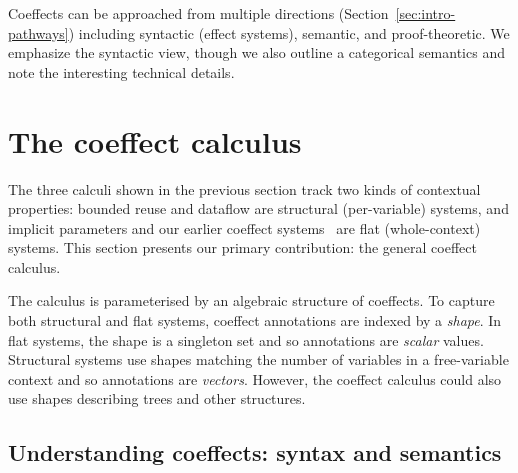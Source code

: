 \noindent
Coeffects can be approached from multiple directions (Section~\ref{sec:intro-pathways}) including 
syntactic (effect systems), semantic, and proof-theoretic. We 
emphasize the syntactic view, though we also outline a categorical semantics
and note the interesting technical details. 


\section{The coeffect calculus}
\label{sec:coeffects}

The three calculi shown in the previous section track two kinds of
contextual properties: bounded reuse and dataflow are structural
(per-variable) systems, and implicit parameters and our earlier coeffect
systems~\cite{petricek2013coeffects} are flat (whole-context) systems. 
This section presents our primary contribution: the general coeffect
calculus.  

The calculus is parameterised by an algebraic structure of coeffects.
To capture both structural and flat systems, coeffect annotations are
indexed by a \emph{shape}. In flat systems, the shape is a singleton set
and so annotations are \emph{scalar} values. Structural systems use shapes
matching the number of variables in a free-variable context and so annotations
are \emph{vectors}. However, the coeffect calculus could also use shapes describing
trees and other structures.


\subsection{Understanding coeffects: syntax and semantics}

